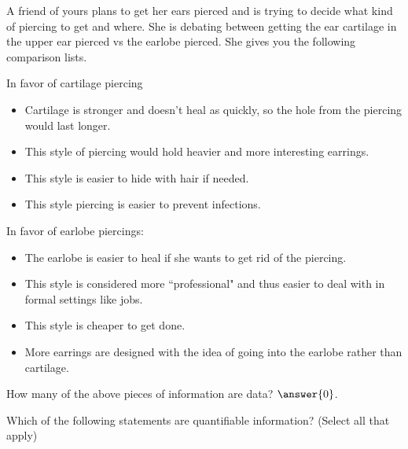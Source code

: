 \documentclass{ximera}
\begin{document}
\begin{problem}
    A friend of yours plans to get her ears pierced and is trying to decide what kind of piercing to get and where. She is debating between getting the ear cartilage in the upper ear pierced vs the earlobe pierced. She gives you the following comparison lists.
    
    In favor of cartilage piercing
    \begin{itemize}
        \item Cartilage is stronger and doesn't heal as quickly, so the hole from the piercing would last longer.
        \item This style of piercing would hold heavier and more interesting earrings.
        \item This style is easier to hide with hair if needed.
        \item This style piercing is easier to prevent infections.
    \end{itemize}
    
    In favor of earlobe piercings:
    \begin{itemize}
        \item The earlobe is easier to heal if she wants to get rid of the piercing.
        \item This style is considered more ``professional" and thus easier to deal with in formal settings like jobs.
        \item This style is cheaper to get done.
        \item More earrings are designed with the idea of going into the earlobe rather than cartilage.
    \end{itemize}
    How many of the above pieces of information are data? $\answer{0}$.
    \begin{problem}
        Which of the following statements are quantifiable information? (Select all that apply)
        \begin{selectAll}
        \end{selectAll}
        

\end{problem}
\end{problem}
\end{document}
